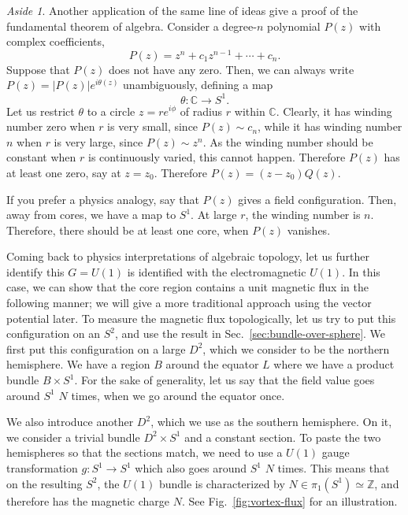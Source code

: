 \documentclass[12pt]{article}
\numberwithin{equation}{section}
\theoremstyle{remark}
\newtheorem{aside}[definition]{Aside}
\def\bC{\mathbb{C}}
\def\bZ{\mathbb{Z}}
\begin{document}
\begin{aside}
Another application of the same line of ideas give a proof of the fundamental theorem of algebra.
Consider a degree-$n$ polynomial $P(z)$ with complex coefficients, \begin{equation}
P(z)=z^n + c_1 z^{n-1} +\cdots + c_n.
\end{equation}
Suppose that $P(z)$ does not have any zero.
Then, we can always write $P(z)=|P(z)| e^{i\theta(z)}$ unambiguously,
defining a map \begin{equation}
\theta: \bC \to S^1.
\end{equation}
Let us restrict $\theta$ to a circle $z=r e^{i\phi}$  of radius $r$ within $\bC$.
Clearly, it has winding number zero when $r$ is very small, since $P(z) \sim c_n$,
while it has winding number $n$ when $r$ is very large, since $P(z)\sim z^n$.
As the winding number should be constant when $r$ is continuously varied,
this cannot happen.
Therefore $P(z)$ has at least one zero, say at $z=z_0$.
Therefore $P(z)=(z-z_0)Q(z)$.

If you prefer a physics analogy, 
say that $P(z)$ gives a field configuration.
Then, away from cores, we have a map to $S^1$.
At large $r$, the winding number is $n$. 
Therefore, there should be at least one core, when $P(z)$ vanishes.
\end{aside}


Coming back to physics interpretations of algebraic topology,
let us further identify this $G=U(1)$ is identified with the electromagnetic $U(1)$.
In this case, we can show that the core region contains a unit magnetic flux in the following manner;
we will give a more traditional approach using the vector potential later.
To measure the magnetic flux topologically,
let us try to put this configuration on an $S^2$, and use the result in Sec.~\ref{sec:bundle-over-sphere}.
We first put this configuration on a large $D^2$, which we consider to be the northern hemisphere.
We have a region $B$ around the equator $L$ 
where we have a product bundle $B \times S^1$.
For the sake of generality,
let us say that the field value  goes around $S^1$ $N$ times, when we go around the equator once.

We also introduce another $D^2$, which we use as the southern hemisphere.
On it, we consider a trivial bundle $D^2\times S^1$ and a constant section.
To paste the two hemispheres so that the sections match, 
we need to use a $U(1)$ gauge transformation $g:S^1\to S^1$ which also goes around $S^1$ $N$ times.
This means that on the resulting $S^2$, the $U(1)$ bundle
is characterized by $N\in \pi_1(S^1)\simeq \bZ$,
and therefore has the magnetic charge $N$.
See Fig.~\ref{fig:vortex-flux} for an illustration.
\end{document}
